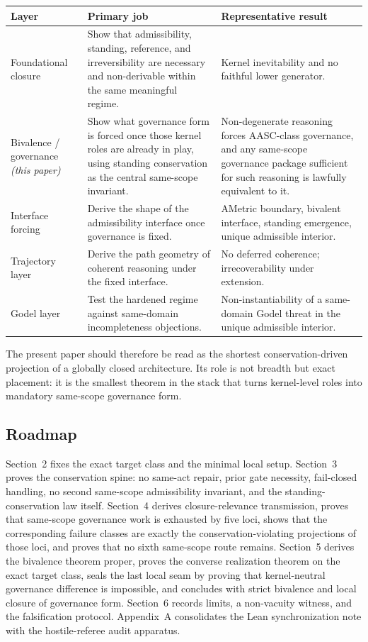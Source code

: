 \documentclass[11pt]{article}
\begin{document}
\begin{center}
\renewcommand{\arraystretch}{1.2}
\small
\begin{tabular}{|p{}|p{}|p{}|}
\hline
\textbf{Layer} & \textbf{Primary job} & \textbf{Representative result} \\
\hline
Foundational closure & Show that admissibility, standing, reference, and irreversibility are necessary and non-derivable within the same meaningful regime. & Kernel inevitability and no faithful lower generator. \\
\hline
Bivalence / governance \textit{(this paper)} & Show what governance form is forced once those kernel roles are already in play, using standing conservation as the central same-scope invariant. & Non-degenerate reasoning forces AASC-class governance, and any same-scope governance package sufficient for such reasoning is lawfully equivalent to it. \\
\hline
Interface forcing & Derive the shape of the admissibility interface once governance is fixed. & AMetric boundary, bivalent interface, standing emergence, unique admissible interior. \\
\hline
Trajectory layer & Derive the path geometry of coherent reasoning under the fixed interface. & No deferred coherence; irrecoverability under extension. \\
\hline
Godel layer & Test the hardened regime against same-domain incompleteness objections. & Non-instantiability of a same-domain Godel threat in the unique admissible interior. \\
\hline
\end{tabular}
\end{center}

The present paper should therefore be read as the shortest conservation-driven projection of a globally closed architecture. Its role is not breadth but exact placement: it is the smallest theorem in the stack that turns kernel-level roles into mandatory same-scope governance form.

\subsection{Roadmap}

Section~2 fixes the exact target class and the minimal local setup. Section~3 proves the conservation spine: no same-act repair, prior gate necessity, fail-closed handling, no second same-scope admissibility invariant, and the standing-conservation law itself. Section~4 derives closure-relevance transmission, proves that same-scope governance work is exhausted by five loci, shows that the corresponding failure classes are exactly the conservation-violating projections of those loci, and proves that no sixth same-scope route remains. Section~5 derives the bivalence theorem proper, proves the converse realization theorem on the exact target class, seals the last local seam by proving that kernel-neutral governance difference is impossible, and concludes with strict bivalence and local closure of governance form. Section~6 records limits, a non-vacuity witness, and the falsification protocol. Appendix~A consolidates the Lean synchronization note with the hostile-referee audit apparatus.
\end{document}
